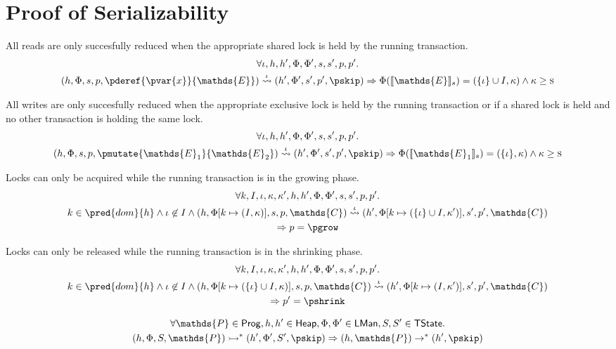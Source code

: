 \section{Proof of Serializability}

\lem All reads are only succesfully reduced when the appropriate shared lock is held by the running transaction.
\begin{gather*}
\forall \iota, h, h', \Phi, \Phi', s, s', p, p' \ldotp \\ (h, \Phi, s, p, \pderef{\pvar{x}}{\mathds{E}}) \overset{\iota}{\rightsquigarrow} (h', \Phi', s', p', \pskip) \Rightarrow \Phi(\llbracket \mathds{E} \rrbracket_s) = (\{\iota\} \cup I, \kappa) \land \kappa \geq \textsc{s}
\end{gather*}

\lem All writes are only succesfully reduced when the appropriate exclusive lock is held by the running transaction or if a shared lock is held and no other transaction is holding the same lock.
\begin{gather*}
\forall \iota, h, h', \Phi, \Phi', s, s', p, p' \ldotp \\ (h, \Phi, s, p, \pmutate{\mathds{E}_1}{\mathds{E}_2}) \overset{\iota}{\rightsquigarrow} (h', \Phi', s', p', \pskip) \Rightarrow \Phi(\llbracket \mathds{E}_1 \rrbracket_s) = (\{\iota\}, \kappa) \land \kappa \geq \textsc{s}
\end{gather*}

\lem Locks can only be acquired while the running transaction is in the growing phase.
\begin{gather*}
\forall k, I, \iota, \kappa, \kappa', h, h', \Phi, \Phi', s, s', p, p' \ldotp \\ 
k \in \pred{dom}{h} \land \iota \not\in I \land (h, \Phi[k \mapsto (I, \kappa)], s, p, \mathds{C}) \overset{\iota}{\rightsquigarrow} (h', \Phi[k \mapsto (\{\iota\} \cup I, \kappa')], s', p', \mathds{C}) \\
\Rightarrow p = \pgrow
\end{gather*}

\lem Locks can only be released while the running transaction is in the shrinking phase.
\begin{gather*}
\forall k, I, \iota, \kappa, \kappa', h, h', \Phi, \Phi', s, s', p, p' \ldotp \\ 
k \in \pred{dom}{h} \land \iota \not\in I \land (h, \Phi[k \mapsto (\{\iota\} \cup I, \kappa)], s, p, \mathds{C}) \overset{\iota}{\rightsquigarrow} (h', \Phi[k \mapsto (I, \kappa')], s', p', \mathds{C}) \\
\Rightarrow p' = \pshrink
\end{gather*}

\begin{gather*}
\forall \mathds{P} \in \mathsf{Prog}, h, h' \in \mathsf{Heap}, \Phi, \Phi' \in \mathsf{LMan}, S, S' \in \mathsf{TState} \ldotp \\ (h, \Phi, S, \mathds{P}) \rightarrowtail^* (h', \Phi', S', \pskip) \Rightarrow (h, \mathds{P}) \rightarrow^* (h', \pskip)
\end{gather*}